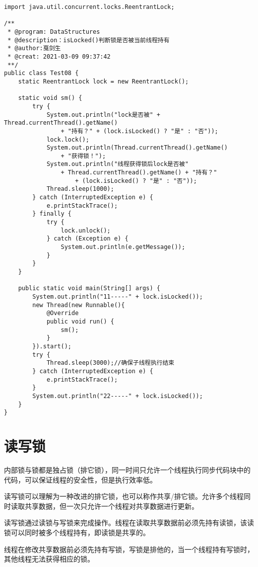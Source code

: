 \documentclass[a4paper]{report}
\begin{document}
\begin{Verbatim}[frame=single,numbersep=5pt,xleftmargin=1.5em,xrightmargin=1.5em]
import java.util.concurrent.locks.ReentrantLock;

/**
 * @program: DataStructures
 * @description：isLocked()判断锁是否被当前线程持有
 * @author:戛剑生
 * @creat: 2021-03-09 09:37:42
 **/
public class Test08 {
    static ReentrantLock lock = new ReentrantLock();

    static void sm() {
        try {
            System.out.println("lock是否被" + Thread.currentThread().getName()
                + "持有？" + (lock.isLocked() ? "是" : "否"));
            lock.lock();
            System.out.println(Thread.currentThread().getName()
                + "获得锁！");
            System.out.println("线程获得锁后lock是否被"
                + Thread.currentThread().getName() + "持有？"
                    + (lock.isLocked() ? "是" : "否"));
            Thread.sleep(1000);
        } catch (InterruptedException e) {
            e.printStackTrace();
        } finally {
            try {
                lock.unlock();
            } catch (Exception e) {
                System.out.println(e.getMessage());
            }
        }
    }

    public static void main(String[] args) {
        System.out.println("11-----" + lock.isLocked());
        new Thread(new Runnable(){
            @Override
            public void run() {
                sm();
            }
        }).start();
        try {
            Thread.sleep(3000);//确保子线程执行结束
        } catch (InterruptedException e) {
            e.printStackTrace();
        }
        System.out.println("22-----" + lock.isLocked());
    }
}\end{Verbatim}
\section{读写锁}

内部锁与锁都是独占锁（排它锁），同一时间只允许一个线程执行同步代码块中的代码，可以保证线程的安全性，但是执行效率低。

读写锁可以理解为一种改进的排它锁，也可以称作共享/排它锁。允许多个线程同时读取共享数据，但一次只允许一个线程对共享数据进行更新。

读写锁通过读锁与写锁来完成操作。线程在读取共享数据前必须先持有读锁，该读锁可以同时被多个线程持有，即读锁是共享的。

线程在修改共享数据前必须先持有写锁，写锁是排他的，当一个线程持有写锁时，其他线程无法获得相应的锁。
\end{document}
